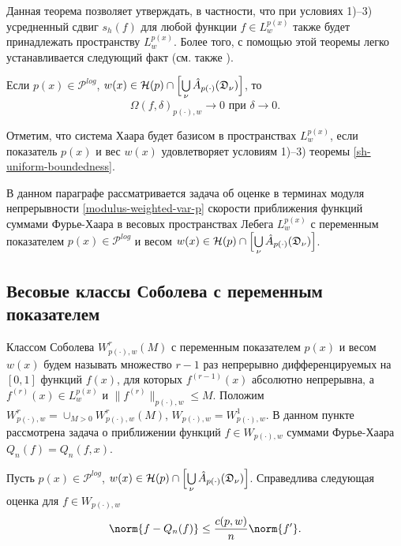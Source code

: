Данная теорема позволяет утверждать, в частности, что при условиях 1)--3) усредненный сдвиг $s_h(f)$ для любой функции $f \in L^{p(x)}_w$  также будет принадлежать пространству  $L^{p(x)}_w$. Более того, с помощью этой теоремы легко устанавливается следующий факт (см. также \cite[лемма 3.2]{shii-haarspeed}).

\begin{lemma}
Если
$p(x) \in \mathcal{P}^{log}$,
$w(x) \in \mathcal{H}(p) \cap \Bigl[\bigcup\limits_\nu \hat{A}_{p(\cdot)}(\mathfrak{D}_\nu)\Bigr]$,
то
\begin{equation}\label{modulusTendToZero}
\Omega(f,\delta)_{p(\cdot),w} \to 0  \textrm{ при } \delta \to 0.
\end{equation}
\end{lemma}

Отметим, что система Хаара будет базисом в пространствах $L^{p(x)}_w$, если показатель $p(x)$ и вес $w(x)$ удовлетворяет условиям 1)--3) теоремы \ref{sh-uniform-boundedness}.

В данном параграфе рассматривается задача об оценке в терминах модуля непрерывности \eqref{modulus-weighted-var-p} скорости приближения функций суммами Фурье-Хаара в весовых пространствах Лебега $L^{p(x)}_w$ с переменным показателем $p(x)\in \mathcal{P}^{log}$ и весом $w(x)\in \mathcal{H}(p) \cap \Bigl[\bigcup\limits_\nu \hat{A}_{p(\cdot)}(\mathfrak{D}_\nu)\Bigr]$.

\subsection{Весовые классы Соболева с переменным показателем}
Классом Соболева $W_{p(\cdot),w}^r(M)$ с переменным показателем $p(x)$ и весом $w(x)$ будем называть множество $r-1$ раз непрерывно дифференцируемых на $[0,1]$ функций $f(x)$, для которых $f^{(r-1)}(x)$ абсолютно непрерывна, а $f^{(r)}(x)\in L^{p(x)}_w$ и $\|f^{(r)}\|_{p(\cdot),w}\le M$.
Положим $W^r_{p(\cdot),w}=\cup_{M>0} W^r_{p(\cdot),w}(M)$, $W_{p(\cdot),w}=W_{p(\cdot),w}^1$. В данном пункте рассмотрена задача о приближении функций $f\in W_{p(\cdot),w}$ суммами Фурье-Хаара $Q_n(f)=Q_n(f,x)$.
\begin{theorem}\label{convSpeedWpw}
Пусть $p(x) \in \mathcal{P}^{log}$, $w(x) \in \mathcal{H}(p) \cap \Bigl[\bigcup\limits_\nu \hat{A}_{p(\cdot)}(\mathfrak{D}_\nu)\Bigr]$. Справедлива следующая оценка для $f \in W_{p(\cdot),w}$
\begin{equation*}
\norm{f-Q_n(f)} \le \frac{c(p,w)}{n} \norm{f'}.
\end{equation*}
\end{theorem}

